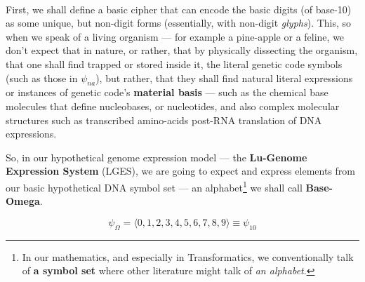 \documentclass[a4paper, 18pt]{book} %
\begin{document}
\vspace{2em}
\\



\vspace{2em}
First, we shall define a basic cipher that can encode the basic digits (of base-10) as some unique, but non-digit forms (essentially, with non-digit \textit{glyphs}). This, so when we speak of a living organism --- for example a pine-apple or a feline, we don't expect that in nature, or rather, that by physically dissecting the organism, that one shall find trapped or stored inside it, the literal genetic code symbols (such as those in $\psi_{na}$), but rather, that they shall find natural literal expressions or instances of genetic code's \textbf{material basis} --- such as the chemical base molecules that define nucleobases, or nucleotides, and also complex molecular structures such as transcribed amino-acids post-RNA translation of DNA expressions.

So, in our hypothetical genome expression model --- the \textbf{Lu-Genome Expression System} (LGES), we are going to expect and express elements from our basic hypothetical DNA symbol set --- an alphabet\footnote{In our mathematics, and especially in Transformatics, we conventionally talk of \textbf{a symbol set} where other literature might talk of \textit{an alphabet}.} we shall call \textbf{Base-Omega}.

\vspace{1em}
\begin{equation}
\label{EQHYPDNASS}
\psi_{\Omega} = \langle 0, 1, 2, 3, 4, 5, 6, 7, 8, 9 \rangle \equiv \psi_{10}
\end{equation}
\vspace{1em}
\end{document}
